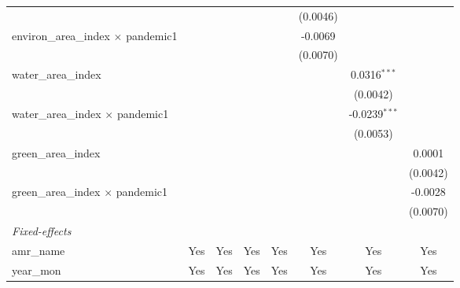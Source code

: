 \begin{table}[htbp]
\begin{tabular}{lccccccc}
                                                 &                &                &                &                & (0.0046)       &                 &   \\   
      environ\_area\_index $\times$ pandemic1    &                &                &                &                & -0.0069        &                 &   \\   
                                                 &                &                &                &                & (0.0070)       &                 &   \\   
      water\_area\_index                         &                &                &                &                &                & 0.0316$^{***}$  &   \\   
                                                 &                &                &                &                &                & (0.0042)        &   \\   
      water\_area\_index $\times$ pandemic1      &                &                &                &                &                & -0.0239$^{***}$ &   \\   
                                                 &                &                &                &                &                & (0.0053)        &   \\   
      green\_area\_index                         &                &                &                &                &                &                 & 0.0001\\   
                                                 &                &                &                &                &                &                 & (0.0042)\\   
      green\_area\_index $\times$ pandemic1      &                &                &                &                &                &                 & -0.0028\\   
                                                 &                &                &                &                &                &                 & (0.0070)\\   
      \midrule
      \emph{Fixed-effects}\\
      amr\_name                                  & Yes            & Yes            & Yes            & Yes            & Yes            & Yes             & Yes\\  
      year\_mon                                  & Yes            & Yes            & Yes            & Yes            & Yes            & Yes             & Yes\\  

\end{tabular}
\end{table}
